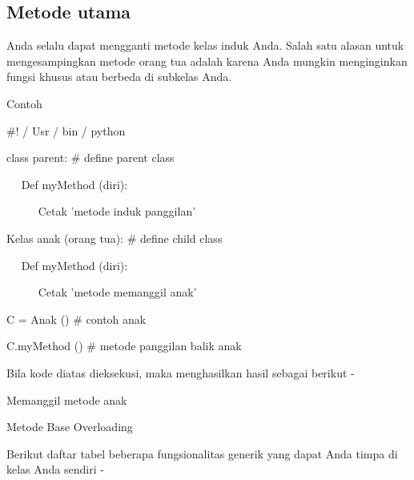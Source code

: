 {\subsection{Metode utama}
Anda selalu dapat mengganti metode kelas induk Anda. Salah satu alasan untuk mengesampingkan metode orang tua adalah karena Anda mungkin menginginkan fungsi khusus atau berbeda di subkelas Anda. \par
Contoh \par
\vspace{12pt}
\noindent 
 $  \#  $! / Usr / bin / python \par
\vspace{12pt}
\noindent 
class parent:  $  \#  $ define parent class \par
\noindent 
~~ Def myMethod (diri): \par
\noindent 
~~~~~ Cetak 'metode induk panggilan' \par
\vspace{12pt}
\noindent 

Kelas anak (orang tua):  $  \#  $ define child class \par
\noindent 
~~ Def myMethod (diri): \par
\noindent 
~~~~~ Cetak 'metode memanggil anak' \par
\vspace{12pt}
\noindent 
C = Anak ()  $  \#  $ contoh anak \par
\noindent 
C.myMethod ()  $  \#  $ metode panggilan balik anak \par
\vspace{12pt}
\noindent 
Bila kode diatas dieksekusi, maka menghasilkan hasil sebagai berikut - \par
\vspace{12pt}
\noindent 
Memanggil metode anak \par
\vspace{12pt}
\noindent 
Metode Base Overloading \par
\vspace{12pt}
\noindent 
Berikut daftar tabel beberapa fungsionalitas generik yang dapat Anda timpa di kelas Anda sendiri - \par
\vspace{14pt}
\noindent 

}
